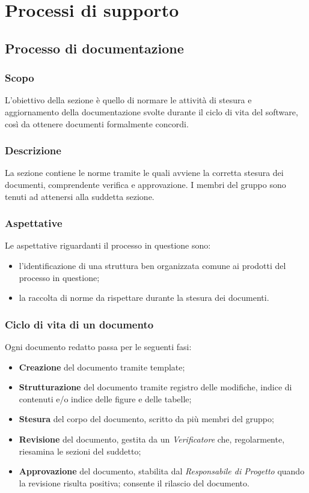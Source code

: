 \section{Processi di supporto}
\subsection{Processo di documentazione}
\subsubsection{Scopo}
L'obiettivo della sezione è quello di normare le attività di stesura e aggiornamento della documentazione svolte durante il ciclo di vita del software, così da ottenere documenti formalmente concordi.
\subsubsection{Descrizione}
La sezione contiene le norme tramite le quali avviene la corretta stesura dei documenti, comprendente verifica e approvazione. I membri del gruppo sono tenuti ad attenersi alla suddetta sezione.
\subsubsection{Aspettative}
Le aspettative riguardanti il processo in questione sono:
\begin{itemize}
	\item l'identificazione di una struttura ben organizzata comune ai prodotti del processo in questione;
	\item la raccolta di norme da rispettare durante la stesura dei documenti.
\end{itemize}
\subsubsection{Ciclo di vita di un documento}
Ogni documento redatto passa per le seguenti fasi:
\begin{itemize}
	\item \textbf{Creazione} del documento tramite template;
	\item \textbf{Strutturazione} del documento tramite registro delle modifiche, indice di contenuti e/o indice delle figure e delle tabelle;
	\item \textbf{Stesura} del corpo del documento, scritto da più membri del gruppo;
	\item \textbf{Revisione} del documento, gestita da un \textit{Verificatore} che, regolarmente, riesamina le sezioni del suddetto;
	\item \textbf{Approvazione} del documento, stabilita dal \textit{Responsabile di Progetto} quando la revisione risulta positiva; consente il rilascio del documento. 
\end{itemize}
